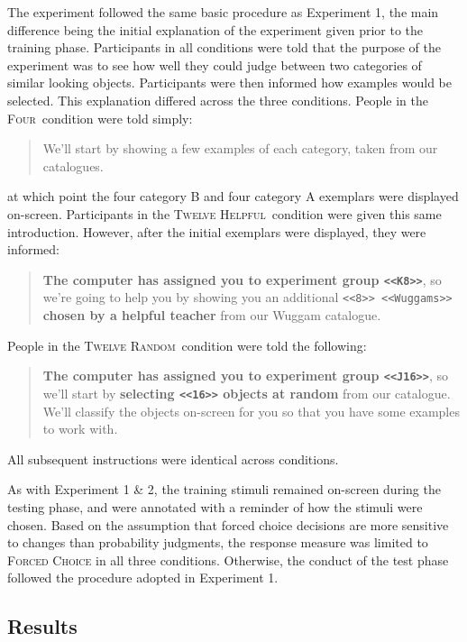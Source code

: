 \documentclass[doc,apacite]{apa6}
\newcommand{\random}{\textsc{Twelve Random}}
\newcommand{\helpful}{\textsc{Twelve Helpful}}
\newcommand{\neutral}{\textsc{Four}}
\begin{document}
The experiment followed the same basic procedure as Experiment 1, the main
difference being the initial explanation of the experiment given prior to the
training phase. Participants in all conditions were told that the purpose of the
experiment was to see how well they could judge between two categories of
similar looking objects. Participants were then informed how examples would be
selected. This explanation differed across the three conditions. People in the
\neutral\ condition were told simply:
%
\begin{quote}
  We'll start by showing a few examples of each category, taken from our catalogues.
\end{quote}
%
\noindent at which point the four category B and four category A exemplars were
displayed on-screen. Participants in the \helpful\ condition were given 
this same introduction. However, after the initial exemplars were displayed,
they were informed:
%
\begin{quote}
{\bf The computer has assigned you to experiment group {\tt <<{\bf K8}>>}}, so we're
going to help you by showing you an additional {\tt <<8>> <<Wuggams>>} {\bf chosen by a helpful teacher} from our Wuggam catalogue.
\end{quote}
%
\noindent People in the \random\ condition were told the following:
%
\begin{quote}
{\bf The computer has assigned you to experiment group {\tt <<{\bf J16}>>}}, so
we'll start by {\bf selecting {\tt <<{\bf 16}>>} objects at random} from our catalogue. We'll classify the objects on-screen for you so that you have some examples to work with.
\end{quote}
%
All subsequent instructions were identical across conditions. 

As with Experiment 1 \& 2, the training stimuli remained on-screen during the
testing phase, and were annotated with a reminder of how the stimuli were
chosen. Based on the assumption that forced choice decisions are more sensitive to 
changes than probability judgments, the response measure was limited to 
{\textsc{Forced Choice}} in all three conditions. Otherwise, the conduct of the
test phase followed the procedure adopted in Experiment 1.

\subsection{Results}
\end{document}
